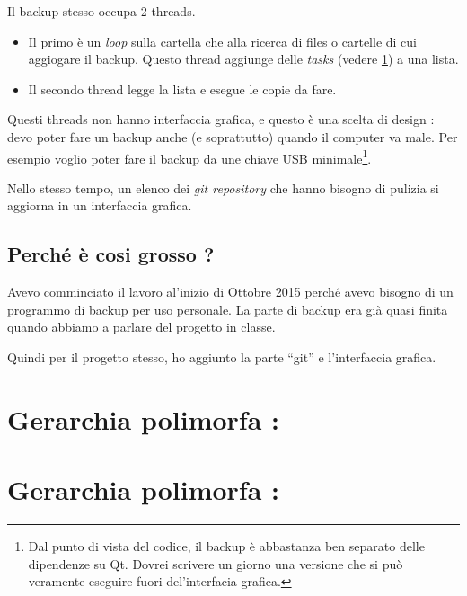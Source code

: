 \documentclass[a4paper,12pt]{article}
\begin{document}
Il backup stesso occupa 2 threads.
\begin{itemize}
    \item Il primo è un \emph{loop} sulla cartella  che alla ricerca di files o cartelle di cui aggiogare il backup. Questo thread aggiunge delle \emph{tasks} (vedere \ref{SECooVDGXooHTFdPE}) a una lista.
    \item Il secondo thread legge la lista e esegue le copie da fare.
\end{itemize}
Questi threads non hanno interfaccia grafica, e questo è una scelta di design : devo poter fare un backup anche (e soprattutto) quando il computer va male. Per esempio voglio poter fare il backup da une chiave USB minimale\footnote{Dal punto di vista del codice, il backup è abbastanza ben separato delle dipendenze su Qt. Dovrei scrivere un giorno una versione che si può veramente eseguire fuori del'interfacia grafica.}.

Nello stesso tempo, un elenco dei \emph{git repository} che hanno bisogno di pulizia si aggiorna in un interfaccia grafica.

\subsection{Perché è cosi grosso ?}

Avevo comminciato il lavoro al'inizio di Ottobre 2015 perché avevo bisogno di un programmo di backup per uso personale. La parte di backup era già quasi finita quando abbiamo a parlare del progetto in classe.

Quindi per il progetto stesso, ho aggiunto la parte ``git'' e l'interfaccia grafica.


\section{Gerarchia polimorfa : }
\label{SECooVDGXooHTFdPE}

\section{Gerarchia polimorfa : }
\end{document}
